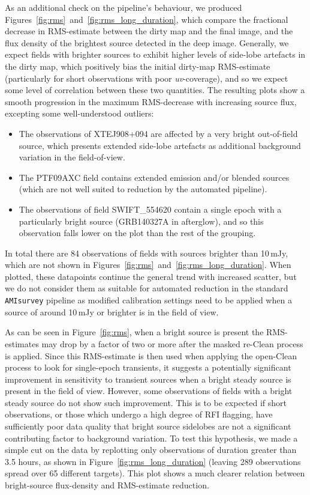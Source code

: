 \documentclass[5p,authoryear]{elsarticle}
\begin{document}
As an additional check on the pipeline's behaviour, we produced Figures~\ref{fig:rms}~and~\ref{fig:rms_long_duration}, which compare the fractional decrease in RMS-estimate between the dirty map and the final image, and the flux density of the brightest source detected in the deep image. 
Generally, we expect fields with brighter sources to exhibit higher levels of side-lobe artefacts in the dirty map, which positively bias the initial dirty-map RMS-estimate (particularly for short observations with poor \textit{uv}-coverage), and so we expect some level of correlation between these two quantities. 
The resulting plots show a smooth progression in the maximum RMS-decrease with increasing source flux, excepting some well-understood outliers:
\begin{itemize}
   \item The observations of XTEJ908+094 are affected by a very bright out-of-field source, which presents extended side-lobe artefacts as additional background variation in the field-of-view.
   \item The PTF09AXC field contains extended emission and/or blended sources (which are not well suited to reduction by the automated pipeline).
   \item The observations of field SWIFT\_554620 contain a single epoch with a particularly bright source (GRB140327A in afterglow), and so this observation falls lower on the  plot than the rest of the grouping.
\end{itemize}
In total there are 84 observations of fields with sources brighter than 10\,mJy, which are not shown in Figures~\ref{fig:rms}~and~\ref{fig:rms_long_duration}.
When plotted, these datapoints continue the general trend with increased scatter, but we do not consider them as suitable for automated reduction in the standard \texttt{AMIsurvey} pipeline as modified calibration settings need to be applied when a source of around 10\,mJy or brighter is in the field of view.

As can be seen in Figure~\ref{fig:rms}, when a bright source is present the RMS-estimates may drop by a factor of two or more after the masked re-Clean process is applied. 
Since this RMS-estimate is then used when applying the open-Clean process to look for single-epoch transients, it suggests a potentially significant improvement in sensitivity to transient sources when a bright steady source is present in the field of view. However, some observations of fields with a bright steady source do not show such improvement. This is to be expected if short observations, or those which undergo a high degree of RFI flagging, have sufficiently poor data quality that bright source sidelobes are not a significant contributing factor to background variation. To test this hypothesis, we made a simple cut on the data by replotting only observations of duration greater than 3.5 hours, as shown in Figure~\ref{fig:rms_long_duration} (leaving 289 observations spread over 65 different targets). This plot shows a much clearer relation between bright-source flux-density and RMS-estimate reduction.
\end{document}
